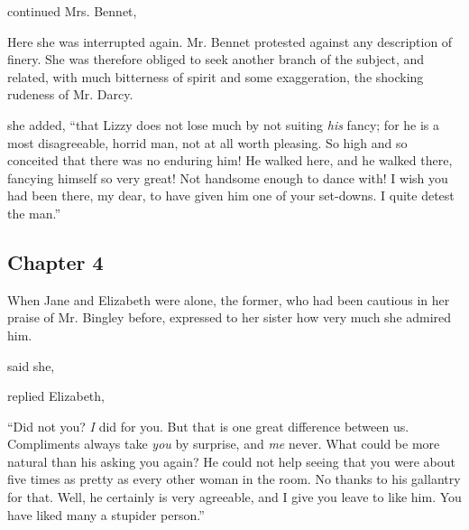  continued Mrs. Bennet, 

Here she was interrupted again. Mr. Bennet protested against any description of finery. She was therefore obliged to seek another branch of the subject, and related, with much bitterness of spirit and some exaggeration, the shocking rudeness of Mr. Darcy.

 she added, “that Lizzy does not lose much by not suiting {\em his} fancy; for he is a most disagreeable, horrid man, not at all worth pleasing. So high and so conceited that there was no enduring him! He walked here, and he walked there, fancying himself so very great! Not handsome enough to dance with! I wish you had been there, my dear, to have given him one of your set-downs. I quite detest the man.”

\subsection[chapter-4]{\useURL[url4][][][]\from[url4] Chapter 4}

When Jane and Elizabeth were alone, the former, who had been cautious in her praise of Mr. Bingley before, expressed to her sister how very much she admired him.

 said she, 

 replied Elizabeth, 


“Did not you? {\em I} did for you. But that is one great difference between us. Compliments always take {\em you} by surprise, and {\em me} never. What could be more natural than his asking you again? He could not help seeing that you were about five times as pretty as every other woman in the room. No thanks to his gallantry for that. Well, he certainly is very agreeable, and I give you leave to like him. You have liked many a stupider person.”

